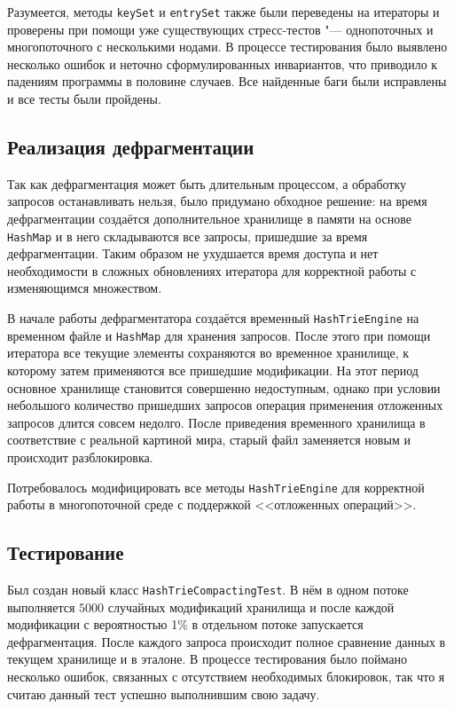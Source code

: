 \documentclass[a4paper]{article}
\renewcommand{\t}{\texttt}
\begin{document}
  Разумеется, методы \t{keySet} и \t{entrySet} также были переведены на итераторы и проверены при помощи
  уже существующих стресс-тестов "--- однопоточных и многопоточного с несколькими нодами. В процессе
  тестирования было выявлено несколько ошибок и неточно сформулированных инвариантов, что приводило к
  падениям программы в половине случаев. Все найденные баги были исправлены и все тесты были пройдены.

\subsection{Реализация дефрагментации}
  Так как дефрагментация может быть длительным процессом, а обработку запросов останавливать нельзя,
  было придумано обходное решение: на время дефрагментации создаётся дополнительное хранилище в памяти
  на основе \t{HashMap} и в него складываются все запросы, пришедшие за время дефрагментации. Таким образом
  не ухудшается время доступа и нет необходимости в сложных обновлениях итератора для корректной работы с
  изменяющимся множеством.

  В начале работы дефрагментатора создаётся временный \t{HashTrieEngine} на временном файле и \t{HashMap}
  для хранения запросов. После этого при помощи итератора все текущие элементы сохраняются во временное хранилище,
  к которому затем применяются все пришедшие модификации. На этот период основное хранилище становится
  совершенно недоступным, однако при условии небольшого количество пришедших запросов операция применения
  отложенных запросов длится совсем недолго. После приведения временного хранилища в соответствие с реальной
  картиной мира, старый файл заменяется новым и происходит разблокировка.

  Потребовалось модифицировать все методы \t{HashTrieEngine} для корректной работы в многопоточной
  среде с поддержкой <<отложенных операций>>.

\subsection{Тестирование}
  Был создан новый класс \t{HashTrieCompactingTest}. В нём в одном потоке выполняется $5000$ случайных модификаций
  хранилища и после каждой модификации с вероятностью 1\% в отдельном потоке запускается дефрагментация. После
  каждого запроса происходит полное сравнение данных в текущем хранилище и в эталоне. В процессе
  тестирования было поймано несколько ошибок, связанных с отсутствием необходимых блокировок, так что я считаю данный
  тест успешно выполнившим свою задачу.
\end{document}
